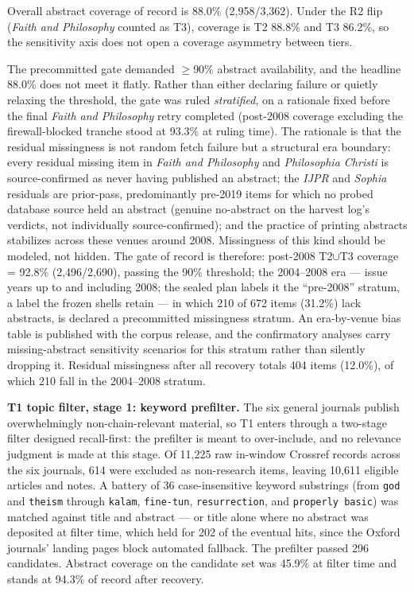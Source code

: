 Overall abstract coverage of record is 88.0\% (2,958/3,362). Under the R2 flip (\emph{Faith and Philosophy} counted as T3), coverage is T2 88.8\% and T3 86.2\%, so the sensitivity axis does not open a coverage asymmetry between tiers.

The precommitted gate demanded $\ge$90\% abstract availability, and the headline 88.0\% does not meet it flatly. Rather than either declaring failure or quietly relaxing the threshold, the gate was ruled \emph{stratified}, on a rationale fixed before the final \emph{Faith and Philosophy} retry completed (post-2008 coverage excluding the firewall-blocked tranche stood at 93.3\% at ruling time). The rationale is that the residual missingness is not random fetch failure but a structural era boundary: every residual missing item in \emph{Faith and Philosophy} and \emph{Philosophia Christi} is source-confirmed as never having published an abstract; the \emph{IJPR} and \emph{Sophia} residuals are prior-pass, predominantly pre-2019 items for which no probed database source held an abstract (genuine no-abstract on the harvest log's verdicts, not individually source-confirmed); and the practice of printing abstracts stabilizes across these venues around 2008. Missingness of this kind should be modeled, not hidden. The gate of record is therefore: post-2008 T2$\cup$T3 coverage = 92.8\% (2,496/2,690), passing the 90\% threshold; the 2004--2008 era --- issue years up to and including 2008; the sealed plan labels it the ``pre-2008'' stratum, a label the frozen shells retain --- in which 210 of 672 items (31.2\%) lack abstracts, is declared a precommitted missingness stratum. An era-by-venue bias table is published with the corpus release, and the confirmatory analyses carry missing-abstract sensitivity scenarios for this stratum rather than silently dropping it. Residual missingness after all recovery totals 404 items (12.0\%), of which 210 fall in the 2004--2008 stratum.

\textbf{T1 topic filter, stage 1: keyword prefilter.} The six general journals publish overwhelmingly non-chain-relevant material, so T1 enters through a two-stage filter designed recall-first: the prefilter is meant to over-include, and no relevance judgment is made at this stage. Of 11,225 raw in-window Crossref records across the six journals, 614 were excluded as non-research items, leaving 10,611 eligible articles and notes. A battery of 36 case-insensitive keyword substrings (from \texttt{god} and \texttt{theism} through \texttt{kalam}, \texttt{fine-tun}, \texttt{resurrection}, and \texttt{properly\ basic}) was matched against title and abstract --- or title alone where no abstract was deposited at filter time, which held for 202 of the eventual hits, since the Oxford journals' landing pages block automated fallback. The prefilter passed 296 candidates. Abstract coverage on the candidate set was 45.9\% at filter time and stands at 94.3\% of record after recovery.

